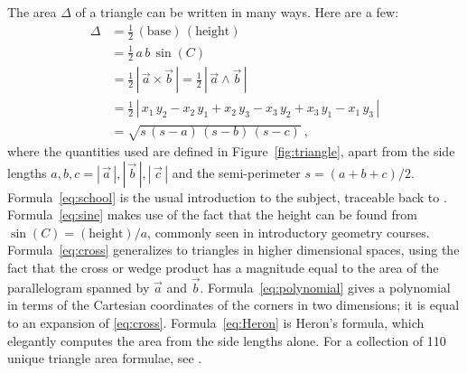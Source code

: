 \documentclass[10pt]{article}
\newcommand{\secbreak}{\bigskip{\centering\footnotesize $\triangle~~~\triangle~~~\triangle$\par}\bigskip\noindent}
\newcommand{\abs}[1]{|\,{#1}\,|}
\begin{document}
\secbreak
The area $\Delta$ of a triangle can be written in many ways.
Here are a few:
\begin{align}
\Delta 
&= \frac{1}{2} \, (\text{base}) \, (\text{height}) \label{eq:school} \\
&= \frac{1}{2}\,a\,b\,\sin(C) \label{eq:sine} \\
&= \frac{1}{2}\, \abs{\vec{a} \times \vec{b}}
    = \frac{1}{2}\, \abs{\vec{a} \wedge \vec{b}}\label{eq:cross} \\
&= \frac{1}{2}\, \abs{
    x_1 \, y_2 - x_2 \, y_1 +
    x_2 \, y_3 - x_3 \, y_2 +
    x_3 \, y_1 - x_1 \, y_3
}\label{eq:polynomial} \\
&= \sqrt{s\,(s-a)\,(s-b)\,(s-c)} \label{eq:Heron} ~,
\end{align}
where the quantities used are defined in Figure~\ref{fig:triangle}, apart from the side lengths
$a, b, c = \abs{\vec{a}}, \abs{\vec{b}}, \abs{\vec{c}}$
and the semi-perimeter $s = (a + b + c)/2$.
Formula~\eqref{eq:school} is the usual introduction to the subject, traceable back to \citet{Euclid300BC}.
Formula~\eqref{eq:sine} makes use of the fact that the height can be found from $\sin(C) = (\text{height}) / a$, commonly seen in introductory geometry courses.
Formula~\eqref{eq:cross} generalizes to triangles in higher dimensional spaces, using the fact that the cross or wedge product has a magnitude equal to the area of the parallelogram spanned by $\vec{a}$ and $\vec{b}$.
Formula~\eqref{eq:polynomial} gives a polynomial in terms of the Cartesian coordinates of the corners in two dimensions; it is equal to an expansion of \eqref{eq:cross}.
Formula~\eqref{eq:Heron} is Heron's formula, which elegantly computes the area from the side lengths alone.
For a collection of 110 unique triangle area formulae, see \citet{Baker1885a,Baker1885b}.
\end{document}
